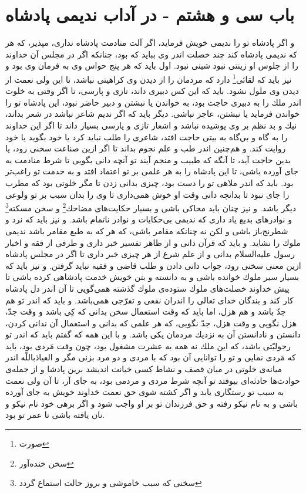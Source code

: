 \section*{باب سى و هشتم - 
در آداب نديمى پادشاه}

و اگر پادشاه تو را نديمى خويش فرمايد، اگر آلت منادمت پادشاه ندارى، مپذير، كه هر كه نديمى پادشاه كند چند خصلت اندر وى ببايد كه بود، چنانكه اگر در مجلس آن خداوند را از جلوس او زينتى نبود شينى نبود. اول بايد كه هر پنج حواس وى به فرمان وى بود و نيز بايد كه لقائى\footnote{صورت} دارد كه مردمان را از ديدن وى كراهيتى نباشد، تا اين ولى نعمت از ديدن وى ملول نشود. بايد كه اين كس دبيرى داند، تازى و پارسى، تا اگر وقتى به خلوت اندر ملك را به دبيرى حاجت بود، به خواندن يا نبشتن و دبير حاضر نبود، اين پادشاه تو را خواندن فرمايد يا نبشتن، عاجز نباشى. ديگر بايد كه اگر نديم شاعر نباشد در شعر بداند، نيك و بد نظم بر وى پوشيده نباشد و اشعار تازى و پارسى بسيار داند تا اگر اين خداوند را به گاه و بي‌گاه به بيتى حاجت افتد، شاعرى را طلب نبايد كرد يا خود بگويد يا خود روايت كند. و هم‌چنين اندر طب و علم نجوم بداند تا اگر ازين صناعت سخنى رود، يا بدين حاجت آيد، تا آنگه كه طبيب و منجم آيند تو آنچه دانى بگويى تا شرط منادمت به جاى آورده باشى، تا اين پادشاه را به هر علمى بر تو اعتماد افتد و به خدمت تو راغب‌تر بود. بايد كه اندر ملاهى تو را دست بود، چيزى بدانى زدن تا مگر خلوتى بود كه مطرب را جاى نبود تا بدانچه دانى وقت او خوش همى‌دارى تا وى را بدان سبب بر تو ولوعى ديگر باشد. و نيز چنان بايد محاكى باشى و بسيار حكايت‌هاى مضاحك\footnote{سخن خنده‌آور} و سخن مسكته\footnote{سخنی که سبب خاموشی و بروز حالت استماع گردد} و نوادرهاى بديع ياد دارى كه نديمى بى‌حكايات و نوادر ناتمام باشد. و نيز بايد كه نرد و شطرنج‌باز باشى و لكن نه چنانكه مقامر باشى، كه هر كه به طبع مقامر باشد نديمى ملوك را نشايد. و بايد كه قرآن دانى و از ظاهر تفسير خبر دارى و طرفى از فقه و اخبار رسول عليه‌السلام بدانى و از علم شرع از هر چيزى خبر دارى تا اگر در مجلس پادشاه ازين معنى سخنى رود، جواب دانى دادن و طلب قاضى و فقيه نبايد گرفتن. و نيز بايد كه بسيار سير ملوك خوانده باشى و به دانسته و بتن خويش خدمت پادشاهى كرده باشى تا پيش خداوند خصلت‌هاى ملوك ستوده‌ی ملوك گذشته همى‌گويى تا آن اندر دل پادشاه كار كند و بندگان خداى تعالى را اندران نفعى و تفرّجى همى‌باشد. و بايد كه اندر تو هم جدّ باشد و هم هزل، اما بايد كه وقت استعمال سخن بدانى كه كِى باشد و وقت جدّ، هزل نگويى و وقت هزل، جدّ نگويى، كه هر علمى كه بدانى و استعمال آن ندانى كردن، دانستن و نادانستن آن به نزديك مردمان يكى باشد. و با اين همه كه گفتم بايد كه اندر تو رجوليّتى باشد، كه اين ملك نه همه به عشرت مشغول بود، چون وقت مَردى بود، بايد كه مَردى نمايى و تو را توانايى آن بود كه با مردى و دو مرد بزنى مگر و العياذباللّه اندر ميانه‌ی خلوتى در ميان قصف و نشاط كسى خيانت انديشد برين پادشا و از جمله‌ی حوادث‌ها حادثه‌اى بيوفتد تو آنچه شرط مردى و مردمى بود، به جاى آر، تا آن ولى نعمت به سبب تو رستگارى يابد و اگر كشته شوى حق نعمت خداوند خويش به جاى آورده باشى و به نام نيكو رفته و حق فرزندان تو بر او واجب شود و اگر برهى خود نام نيكو و نان يافته باشى تا عمر تو بود.

